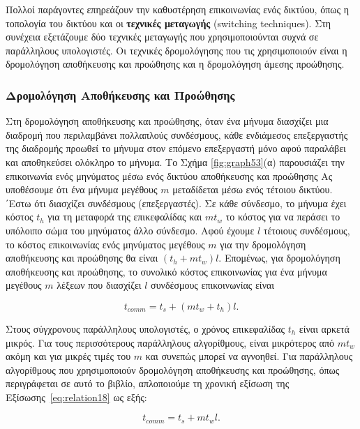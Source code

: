 \documentclass[12pt,a4paper]{article}
\begin{document}
Πολλοί παράγοντες επηρεάζουν την καθυστέρηση επικοινωνίας ενός δικτύου, 
όπως η τοπολογία του δικτύου και οι \textbf{τεχνικές μεταγωγής} 
(\foreignlanguage{english}{switching techniques}). Στη συνέχεια 
εξετάζουμε δύο τεχνικές μεταγωγής που χρησιμοποιούνται συχνά σε παράλληλους 
υπολογιστές. Οι τεχνικές δρομολόγησης που τις χρησιμοποιούν είναι η 
δρομολόγηση αποθήκευσης και προώθησης και η δρομολόγηση άμεσης προώθησης.

\subsubsection{Δρομολόγηση Αποθήκευσης και Προώθησης}
Στη δρομολόγηση αποθήκευσης και προώθησης, όταν ένα μήνυμα διασχίζει μια 
διαδρομή που περιλαμβάνει πολλαπλούς συνδέσμους, κάθε ενδιάμεσος επεξεργαστής 
της διαδρομής προωθεί το μήνυμα στον επόμενο επεξεργαστή μόνο αφού
παραλάβει και αποθηκεύσει ολόκληρο το μήνυμα. Το Σχήμα \ref{fig:graph53}(α) 
παρουσιάζει την επικοινωνία ενός μηνύματος μέσω ενός δικτύου αποθήκευσης και 
προώθησης
Ας υποθέσουμε ότι ένα μήνυμα μεγέθους $m$ μεταδίδεται μέσω ενός τέτοιου 
δικτύου. ΄Εστω ότι διασχίζει συνδέσμους (επεξεργαστές). Σε κάθε σύνδεσμο, 
το μήνυμα έχει κόστος $t_h$ για τη μεταφορά της επικεφαλίδας και $m t_w$ 
το κόστος για να περάσει το υπόλοιπο σώμα του μηνύματος άλλο σύνδεσμο. 
Αφού έχουμε $l$ τέτοιους συνδέσμους, το κόστος επικοινωνίας ενός μηνύματος 
μεγέθους $m$ για την δρομολόγηση αποθήκευσης και προώθησης θα είναι 
$(t_h + m t_w)l$. Επομένως, για δρομολόγηση αποθήκευσης και προώθησης, το 
συνολικό κόστος επικοινωνίας για ένα μήνυμα μεγέθους $m$ λέξεων που 
διασχίζει $l$ συνδέσμους επικοινωνίας είναι

\begin{equation}
t_{comm} = t_s + (m t_w + t_h)l.
\label{eq:relation18}
\end{equation}

\noindent Στους σύγχρονους παράλληλους υπολογιστές, ο χρόνος επικεφαλίδας
$t_h$ είναι αρκετά μικρός. Για τους περισσότερους παράλληλους αλγορίθμους,
είναι μικρότερος από $m t_w$ ακόμη και για μικρές τιμές του $m$ και
συνεπώς μπορεί να αγνοηθεί. Για παράλληλους αλγορίθμους που χρησιμοποιούν
δρομολόγηση αποθήκευσης και προώθησης, όπως περιγράφεται σε αυτό το βιβλίο,
απλοποιούμε τη χρονική εξίσωση της Εξίσωσης~\ref{eq:relation18} ως εξής:

\[
t_{comm} = t_s + m t_w l.
\]
\end{document}
